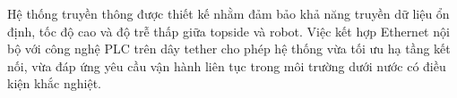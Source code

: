 \documentclass[../DoAn.tex]{subfiles}
\begin{document}
Hệ thống truyền thông được thiết kế nhằm đảm bảo khả năng truyền dữ liệu ổn định, tốc độ cao và độ trễ thấp giữa topside và robot. Việc kết hợp Ethernet nội bộ với công nghệ PLC trên dây tether cho phép hệ thống vừa tối ưu hạ tầng kết nối, vừa đáp ứng yêu cầu vận hành liên tục trong môi trường dưới nước có điều kiện khắc nghiệt.
\end{document}

